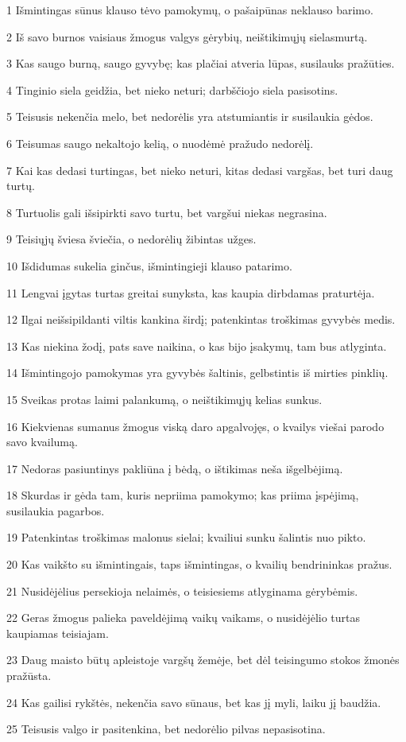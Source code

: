 \par 1 Išmintingas sūnus klauso tėvo pamokymų, o pašaipūnas neklauso barimo. 
\par 2 Iš savo burnos vaisiaus žmogus valgys gėrybių, neištikimųjų siela­smurtą. 
\par 3 Kas saugo burną, saugo gyvybę; kas plačiai atveria lūpas, susilauks pražūties. 
\par 4 Tinginio siela geidžia, bet nieko neturi; darbščiojo siela pasisotins. 
\par 5 Teisusis nekenčia melo, bet nedorėlis yra atstumiantis ir susilaukia gėdos. 
\par 6 Teisumas saugo nekaltojo kelią, o nuodėmė pražudo nedorėlį. 
\par 7 Kai kas dedasi turtingas, bet nieko neturi, kitas dedasi vargšas, bet turi daug turtų. 
\par 8 Turtuolis gali išsipirkti savo turtu, bet vargšui niekas negrasina. 
\par 9 Teisiųjų šviesa šviečia, o nedorėlių žibintas užges. 
\par 10 Išdidumas sukelia ginčus, išmintingieji klauso patarimo. 
\par 11 Lengvai įgytas turtas greitai sunyksta, kas kaupia dirbdamas­ praturtėja. 
\par 12 Ilgai neišsipildanti viltis kankina širdį; patenkintas troškimas­ gyvybės medis. 
\par 13 Kas niekina žodį, pats save naikina, o kas bijo įsakymų, tam bus atlyginta. 
\par 14 Išmintingojo pamokymas yra gyvybės šaltinis, gelbstintis iš mirties pinklių. 
\par 15 Sveikas protas laimi palankumą, o neištikimųjų kelias sunkus. 
\par 16 Kiekvienas sumanus žmogus viską daro apgalvojęs, o kvailys viešai parodo savo kvailumą. 
\par 17 Nedoras pasiuntinys pakliūna į bėdą, o ištikimas neša išgelbėjimą. 
\par 18 Skurdas ir gėda tam, kuris nepriima pamokymo; kas priima įspėjimą, susilaukia pagarbos. 
\par 19 Patenkintas troškimas malonus sielai; kvailiui sunku šalintis nuo pikto. 
\par 20 Kas vaikšto su išmintingais, taps išmintingas, o kvailių bendrininkas pražus. 
\par 21 Nusidėjėlius persekioja nelaimės, o teisiesiems atlyginama gėrybėmis. 
\par 22 Geras žmogus palieka paveldėjimą vaikų vaikams, o nusidėjėlio turtas kaupiamas teisiajam. 
\par 23 Daug maisto būtų apleistoje vargšų žemėje, bet dėl teisingumo stokos žmonės pražūsta. 
\par 24 Kas gailisi rykštės, nekenčia savo sūnaus, bet kas jį myli, laiku jį baudžia. 
\par 25 Teisusis valgo ir pasitenkina, bet nedorėlio pilvas nepasisotina.



